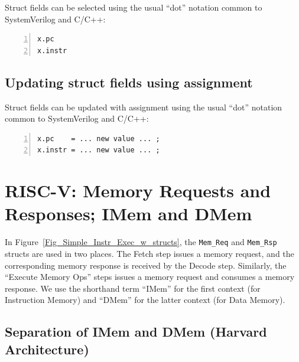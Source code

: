
Struct fields can be selected using the usual ``dot'' notation common
to SystemVerilog and C/C++:

\begin{Verbatim}[frame=single, numbers=left]
x.pc
x.instr
\end{Verbatim}



\subsection{Updating struct fields using assignment}


Struct fields can be updated with assignment using the usual ``dot''
notation common to SystemVerilog and C/C++:

\begin{Verbatim}[frame=single, numbers=left]
x.pc    = ... new value ... ;
x.instr = ... new value ... ;
\end{Verbatim}


\section{RISC-V: Memory Requests and Responses; IMem and DMem}


In Figure~\ref{Fig_Simple_Instr_Exec_w_structs}, the \verb|Mem_Req|
and \verb|Mem_Rsp| structs are used in two places.  The Fetch step
issues a memory request, and the corresponding memory response is
received by the Decode step.  Similarly, the ``Execute Memory Ops''
steps issues a memory request and consumes a memory response.  We use
the shorthand term ``IMem'' for the first context (for Instruction
Memory) and ``DMem'' for the latter context (for Data Memory).


\subsection{Separation of IMem and DMem (Harvard Architecture)}

